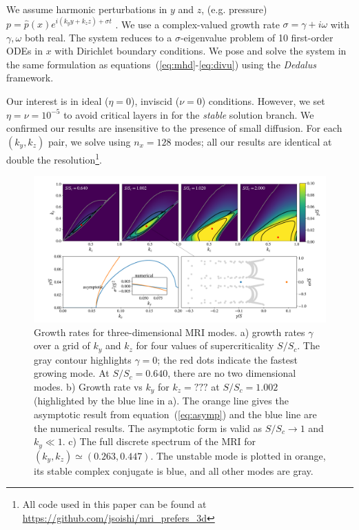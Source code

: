 \documentclass[aps,prl,reprint,superscriptaddress]{revtex4-1}
\newcommand{\SSC}{S/S_{c}}
\begin{document}
We assume harmonic perturbations in $y$ and $z$, (e.g. pressure) $p = \hat{p}(x) e^{i(k_y y + k_z z) + \sigma t}$ . 
We use a complex-valued growth rate $\sigma = \gamma + i\omega$ with $\gamma, \omega$ both real. 
The system reduces to a $\sigma$-eigenvalue problem of 10 first-order ODEs in $x$ with Dirichlet boundary conditions.
We pose and solve the system in the same formulation as equations~(\ref{eq:mhd}-\ref{eq:divu}) using the \emph{Dedalus} framework. 

Our interest is in ideal ($\eta = 0$), inviscid ($\nu = 0$) conditions.
However, we set $\eta=\nu=10^{-5}$ to avoid critical layers in for the \textit{stable} solution branch.
We confirmed our results are insensitive to the presence of small diffusion. 
For each $(k_y, k_z)$ pair, we solve using $n_x = 128$ modes; all our results are identical at double the resolution\footnote{All code used in this paper can be found at \protect\url{https://github.com/jsoishi/mri\_prefers\_3d}}.
\begin{figure}[ht]
  \includegraphics[width=\textwidth]{fig_1.pdf}
  \caption{Growth rates for three-dimensional MRI modes. a) growth rates $\gamma$ over a grid of $k_y$ and $k_z$ for four values of supercriticality $\SSC$. The gray contour highlights $\gamma = 0$; the red dots indicate the fastest growing mode. At $\SSC = 0.640$, there are no two dimensional modes. b) Growth rate vs $k_y$ for $k_z = ???$ at $\SSC = 1.002$ (highlighted by the blue line in a). The orange line gives the asymptotic result from equation~(\ref{eq:asymp}) and the blue line are the numerical results. The asymptotic form is valid as $\SSC \to 1$ and $k_y \ll 1$. c) The full discrete spectrum of the MRI for $(k_y, k_z) \simeq (0.263, 0.447)$. The unstable mode is plotted in orange, its stable complex conjugate is blue, and all other modes are gray.}
  \label{fig:growth_rate}
\end{figure}
\end{document}
